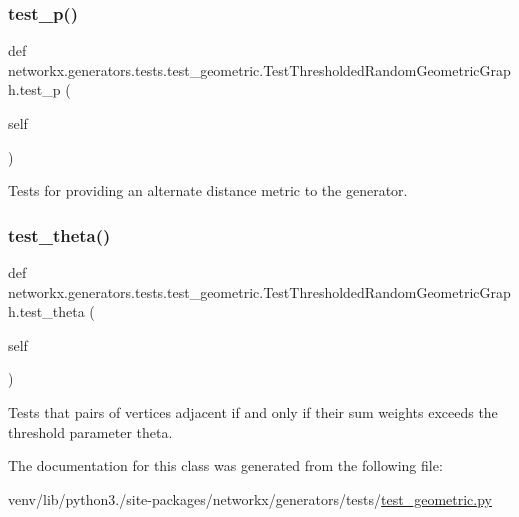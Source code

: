 \subsubsection{\texorpdfstring{test\+\_\+p()}{test\_p()}}
{\footnotesize\ttfamily def networkx.\+generators.\+tests.\+test\+\_\+geometric.\+Test\+Thresholded\+Random\+Geometric\+Graph.\+test\+\_\+p (\begin{DoxyParamCaption}\item[{}]{self }\end{DoxyParamCaption})}

\begin{DoxyVerb}Tests for providing an alternate distance metric to the
generator.\end{DoxyVerb}
 \mbox{\label{classnetworkx_1_1generators_1_1tests_1_1test__geometric_1_1TestThresholdedRandomGeometricGraph_a2781d0a100069c2afb394a5960a584bb}} 
\subsubsection{\texorpdfstring{test\+\_\+theta()}{test\_theta()}}
{\footnotesize\ttfamily def networkx.\+generators.\+tests.\+test\+\_\+geometric.\+Test\+Thresholded\+Random\+Geometric\+Graph.\+test\+\_\+theta (\begin{DoxyParamCaption}\item[{}]{self }\end{DoxyParamCaption})}

\begin{DoxyVerb}Tests that pairs of vertices adjacent if and only if their sum
weights exceeds the threshold parameter theta.
\end{DoxyVerb}
 

The documentation for this class was generated from the following file\+:\begin{DoxyCompactItemize}
\item 
venv/lib/python3./site-\/packages/networkx/generators/tests/\hyperlink{test__geometric_8py}{test\+\_\+geometric.\+py}\end{DoxyCompactItemize}
